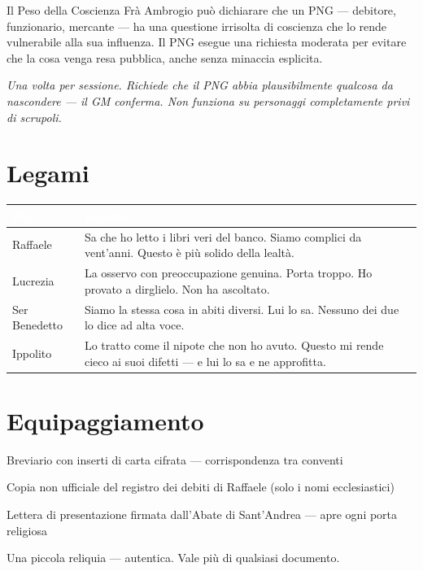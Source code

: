 
\begin{spinolabox}{Il Peso della Coscienza}
  Frà Ambrogio può dichiarare che un PNG — debitore, funzionario, mercante —
  ha una questione irrisolta di coscienza che lo rende vulnerabile alla
  sua influenza. Il PNG esegue una richiesta moderata per evitare che la
  cosa venga resa pubblica, anche senza minaccia esplicita.

  \medskip\noindent\textit{Una volta per sessione. Richiede che il PNG
  abbia plausibilmente qualcosa da nascondere — il GM conferma.
  Non funziona su personaggi completamente privi di scrupoli.}
\end{spinolabox}

\section*{Legami}

\begin{table}[h]
\centering\renewcommand{\arraystretch}{1.4}
\begin{tabularx}{\linewidth}{@{}L{2.6cm} X@{}}
  \toprule{}
  \textcolor{white}{\textbf{PG}} & \textcolor{white}{\textbf{Legame}} \\
  \midrule
  Raffaele & Sa che ho letto i libri veri del banco. Siamo complici da
            vent'anni. Questo è più solido della lealtà. \\
  Lucrezia & La osservo con preoccupazione genuina. Porta troppo.
            Ho provato a dirglielo. Non ha ascoltato. \\
  Ser Benedetto & Siamo la stessa cosa in abiti diversi. Lui lo sa.
                 Nessuno dei due lo dice ad alta voce. \\
  Ippolito & Lo tratto come il nipote che non ho avuto. Questo mi rende
            cieco ai suoi difetti — e lui lo sa e ne approfitta. \\
  \bottomrule
\end{tabularx}
\end{table}

\section*{Equipaggiamento}
\begin{goldlist}
  \item Breviario con inserti di carta cifrata — corrispondenza tra conventi
  \item Copia non ufficiale del registro dei debiti di Raffaele (solo i nomi ecclesiastici)
  \item Lettera di presentazione firmata dall'Abate di Sant'Andrea — apre ogni porta religiosa
  \item Una piccola reliquia --- autentica. Vale più di qualsiasi documento.
\end{goldlist}

